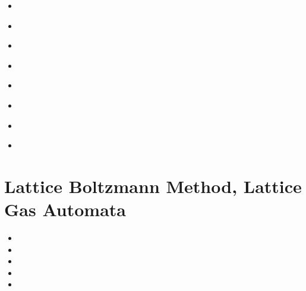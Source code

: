 \begin{scriptsize}
\begin{itemize}
\item[\nineteenninetyfour] 
\item[\nineteenninetyfive] 
 \\ 
\item[\nineteenninetysix] 
 \\
\item[\nineteenninetyseven] 
\item[\nineteenninetyeight] 
 \\
\item[\twothousandthree]
\item[\twothousandfour]
 \\
\item[\twothousandten]
 \\
\end{itemize}
\end{scriptsize}

\section{Lattice Boltzmann Method, Lattice Gas Automata}

\begin{scriptsize}
\begin{itemize}
\item[\nineteeneightyseven]
\item[\twothousandeight]
\item[\twothousandseventeen]
\item[\twothousandeighteen]
\item[\twothousandtwentythree]
\end{itemize}
\end{scriptsize}

